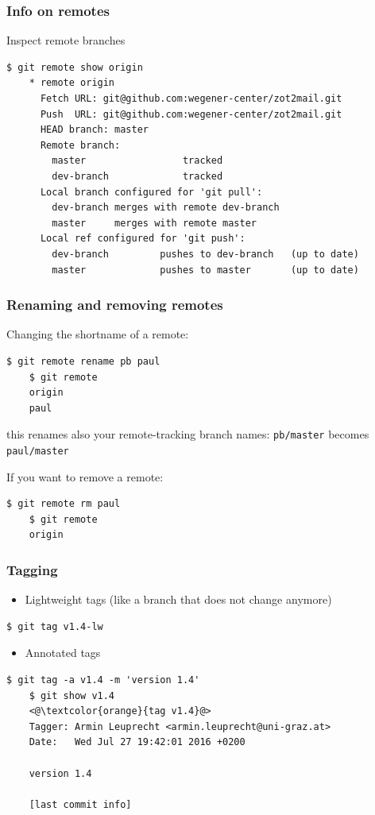\documentclass{beamer}
\begin{document}
\begin{frame}[fragile]
  \frametitle{Info on remotes}
  Inspect remote branches
  \begin{lstlisting}[basicstyle=\ttfamily\tiny]
    $ git remote show origin 
    * remote origin
      Fetch URL: git@github.com:wegener-center/zot2mail.git
      Push  URL: git@github.com:wegener-center/zot2mail.git
      HEAD branch: master
      Remote branch:
        master                 tracked
        dev-branch             tracked
      Local branch configured for 'git pull':
        dev-branch merges with remote dev-branch
        master     merges with remote master
      Local ref configured for 'git push':
        dev-branch         pushes to dev-branch   (up to date)
        master             pushes to master       (up to date)
  \end{lstlisting}
\end{frame}

\begin{frame}[fragile]
  \frametitle{Renaming and removing remotes}
  Changing the shortname of a remote:
  \begin{lstlisting}[basicstyle=\ttfamily\tiny]
    $ git remote rename pb paul
    $ git remote
    origin
    paul
  \end{lstlisting}
  this renames also your remote-tracking branch names: \lstinline{pb/master} becomes \lstinline{paul/master}

  If you want to remove a remote:
  \begin{lstlisting}[basicstyle=\ttfamily\tiny]
    $ git remote rm paul
    $ git remote
    origin
  \end{lstlisting}
\end{frame}

\begin{frame}[fragile]
  \frametitle{Tagging}
  \begin{itemize}
    \item Lightweight tags (like a branch that does not change anymore)
  \end{itemize}
  \begin{lstlisting}[basicstyle=\ttfamily\tiny]
    $ git tag v1.4-lw
  \end{lstlisting}

  \begin{itemize}
    \item Annotated tags
  \end{itemize}
  \begin{lstlisting}[basicstyle=\ttfamily\tiny]
    $ git tag -a v1.4 -m 'version 1.4'
    $ git show v1.4
    <@\textcolor{orange}{tag v1.4}@>
    Tagger: Armin Leuprecht <armin.leuprecht@uni-graz.at>
    Date:   Wed Jul 27 19:42:01 2016 +0200
    
    version 1.4
    
    [last commit info]
  \end{lstlisting}
\end{frame}
\end{document}
